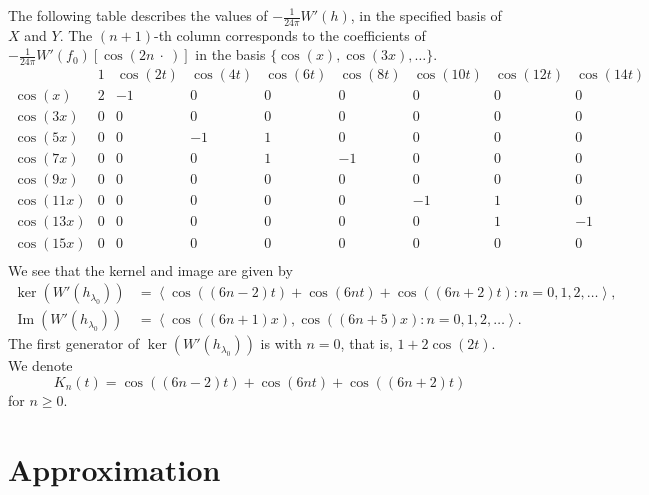 \documentclass{amsart}
\def \im{\operatorname{Im}}
\begin{document}
The following table describes the values of $-\frac 1{24 \pi} W'(h)$, in the specified basis of $X$ and $Y$.
The $(n+1)$-th column corresponds to the coefficients of $-\frac 1{24\pi} W'(f_0)[\cos(2n \ \cdot\ )]$ in the basis $\{\cos(x), \cos(3x), \ldots\}$.
\begin{equation}
	\label{tab_D1}
\begin{array}{c|ccccccccc}
 \text{} & 1 & \cos (2 t) & \cos (4 t) & \cos (6 t) & \cos (8 t) & \cos (10 t) & \cos (12 t) & \cos (14 t) \\%
 \hline
 \cos (x) & 2 & -1 & 0 & 0 & 0 & 0 & 0 & 0 \\%
 \cos (3 x) & 0 & 0 & 0 & 0 & 0 & 0 & 0 & 0 \\%
 \cos (5 x) & 0 & 0 & -1 & 1 & 0 & 0 & 0 & 0 \\%
 \cos (7 x) & 0 & 0 & 0 & 1 & -1 & 0 & 0 & 0 \\%
 \cos (9 x) & 0 & 0 & 0 & 0 & 0 & 0 & 0 & 0 \\%
 \cos (11 x) & 0 & 0 & 0 & 0 & 0 & -1 & 1 & 0 \\%
 \cos (13 x) & 0 & 0 & 0 & 0 & 0 & 0 & 1 & -1 \\%
 \cos (15 x) & 0 & 0 & 0 & 0 & 0 & 0 & 0 & 0 \\%
\end{array}
\end{equation}
We see that the kernel and image are given by
\begin{align}
	\ker(W'(h_{\lambda_0})) &= \left\langle \cos ((6 n-2) t) + \cos (6 n t) + \cos ((6 n+2) t): n = 0,1,2, \ldots \right\rangle,\\
	\im(W'(h_{\lambda_0})) &= \left\langle \cos ((6 n+1)x), \cos((6n+5)x) : n = 0,1,2,\ldots \right\rangle.
\end{align}
The first generator of $\ker(W'(h_{\lambda_0}))$ is with $n=0$, that is, $1 + 2 \cos(2t)$.
We denote
\[
	K_n(t) = \cos ((6 n-2) t) + \cos (6 n t) + \cos ((6 n+2) t)
\]
for $n\geq 0$.

\section{Approximation}
\label{sec_approximation}
\end{document}
